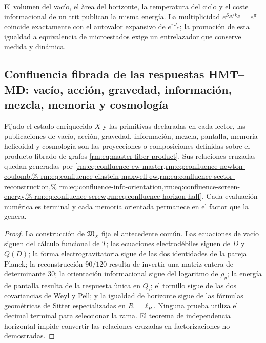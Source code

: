 El volumen del vac\'io, el \`area del horizonte, la temperatura del ciclo y el
coste informacional de un trit publican la misma energ\'ia.  La multiplicidad
\(e^{S_H/k_B}=e^\pi\) coincide exactamente con el autovalor expansivo de
\(e^{\pi J_\varphi}\); la promoci\'on de esta igualdad a equivalencia de
microestados exige un entrelazador que conserve medida y din\'amica.

\subsection{Confluencia fibrada de las respuestas HMT–MD: vacío, acción, gravedad, información, mezcla, memoria y cosmología}

\begin{theorem}
Fijado el estado enriquecido \(X\) y las primitivas declaradas en cada lector,
las publicaciones de vac\'io, acci\'on, gravedad, informaci\'on, mezcla,
pantalla, memoria helicoidal y cosmolog\'ia son las proyecciones o
composiciones definidas sobre el producto fibrado de grafos
\cref{rm:eq:master-fiber-product}. Sus relaciones cruzadas quedan
generadas por
\cref{rm:eq:confluence-ew-master,rm:eq:confluence-newton-coulomb,%
rm:eq:confluence-einstein-maxwell-ew,rm:eq:confluence-sector-reconstruction,%
rm:eq:confluence-info-orientation,rm:eq:confluence-screen-energy,%
rm:eq:confluence-screw,rm:eq:confluence-horizon-half}.
Cada evaluaci\'on num\'erica es terminal y cada memoria orientada permanece en
el factor que la genera.
\end{theorem}

\begin{proof}
La construcci\'on de \(\mathfrak M_X\) fija el antecedente com\'un. Las
ecuaciones de vac\'io siguen del c\'alculo funcional de \(T\); las ecuaciones
electrod\'ebiles siguen de \(D\) y \(Q(D)\); la forma electrogravitatoria sigue
de las dos identidades de la pareja Planck; la reconstrucci\'on \(90/120\)
resulta de invertir una matriz entera de determinante \(30\); la orientaci\'on
informacional sigue del logaritmo de \(\rho_y\); la energ\'ia de pantalla
resulta de la respuesta \`unica en \(Q_{\square}\); el tornillo sigue de las
dos covariancias de Weyl y Pell; y la igualdad de horizonte sigue de las
f\'ormulas geom\'etricas de Sitter especializadas en \(R=\ell_P\). Ninguna
prueba utiliza el decimal terminal para seleccionar la rama.  El teorema de
independencia horizontal impide convertir las relaciones cruzadas en
factorizaciones no demostradas.
\end{proof}

